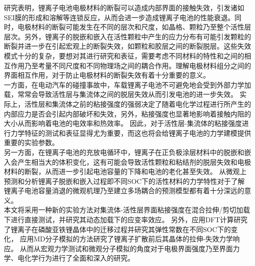 \begin{cabstract}
研究表明，锂离子电池电极材料的断裂可以造成内部界面的接触失效，引发诸如SEI膜的形成和溶解等连锁反应，从而会进一步造成锂离子电池的性能衰退。同时，电极材料的断裂可能发生在不同的层次和尺度，如晶格、颗粒乃至整个活性层层次。另外，锂离子的脱嵌和嵌入在活性颗粒中产生的应力分布有可能引发颗粒的断裂并进一步在引起宏观上的断裂失效，如颗粒和胶层之间的断裂脱层。这些失效模式十分的复杂，要想对其进行研究和表征，需要考虑不同材料的特性和之间的相互作用乃至考量不同尺度和不同物理场之间的耦合作用。理解电极材料组分之间的界面相互作用，对于防止电极材料的断裂失效有着十分重要的意义。\\
\indent 一方面，在电动汽车的碰撞事故中，车载锂离子电池不可避免地会受到外部力学加载，常常会导致活性层与集流体之间的脱层失效从而引发电池的进一步失效。 实际上，活性层和集流体之前的粘接强度的强弱决定了随着电化学过程进行所产生的内部应力是否会引起内部破坏和失效，另外，粘接强度也显著地影响着接触内阻的大小从而影响着电池的电效率和热效率。 因此，对于活性层-集流体的粘接强度进行力学特征的测试和表征显得尤为重要，而这也将会给锂离子电池的力学建模提供重要的实验参数。\\
\indent 另一方面，在锂离子电池的充放电循环中，锂离子在正负极涂层材料中的脱嵌和嵌入会产生相当大的体积变化，这有可能会导致活性颗粒和粘结剂的脱层失效和电极材料的断裂，从而进一步引起电池容量的下降和电池的老化甚至失效。 从微观上预测和分析锂离子脱嵌和嵌入过程即不同SOC下的活性材料的力学特性对于了解锂离子电池容量消退的微观机理乃至建立多场耦合的预测模型都有着十分深远的意义。\\
\indent 本文将采用一种新的实验方法对集流体-活性层界面粘接强度在混合拉伸/剪切加载下进行直接测试，并研究其动态加载下的应变率效应。 另外，应用DFT计算研究了锂离子在磷酸亚铁锂晶体中的迁移过程并研究其弹性常数在不同SOC下的变化， 应用MD分子模拟的方法研究了锂离子扩散前后其晶体的拉伸-失效力学响应。
从而从宏观力学测试和微观分子模拟的角度对于电极界面强度乃至界面力学、电化学行为进行了全面和深入的研究。


\end{cabstract}

